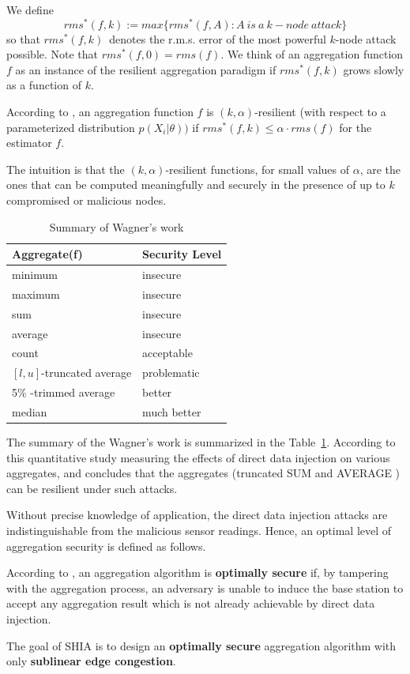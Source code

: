 	We define
	\begin{equation}
		rms^*(f,k) := max\{rms^*(f,A): A\ is\ a\ k-node\ attack\}
	\end{equation}
	so that $rms^*(f,k)$\ denotes the r.m.s. error of the most powerful
	$k$-node attack possible. 
	Note that $rms^* (f, 0) = rms(f)$.
	We think of an aggregation function $f$ as an instance of the resilient aggregation paradigm if $rms^* (f, k)$ grows slowly as a function of $k$.
	\begin{definition}
		According to \cite{wagner2004resilient}, an aggregation function $f$ is $(k, \alpha)$-resilient (with respect to a parameterized distribution $p(X_{i} | \theta))$ if $rms^*(f, k) \le \alpha \cdot rms(f)$ for the estimator $f$.
	\end{definition}
	The intuition is that the $(k, \alpha)$-resilient functions, for small values of $\alpha$, are the ones that can be computed meaningfully and securely in the presence of up to $k$ compromised or malicious nodes.
	\begin{table}[!htb]	
		\begin{center}
			\begin{tabular}{ |l| l| }
				\hline
			    Aggregate(f) & Security Level \\
			    \hline
			    minimum & insecure \\
			    maximum & insecure \\
			    sum & insecure \\
				average & insecure \\
				count & acceptable \\
				$[l,u]$-truncated average & problematic \\
				5\% -trimmed average & better \\
				median & much better \\
			    \hline
			\end{tabular}
		\end{center}
		 \caption{Summary of Wagner's work}
		 \label{table:wagner}
	\end{table}
	The summary of the Wagner's work is summarized in the Table~\ref{table:wagner}.
	According to this quantitative study measuring the effects of direct data injection on various aggregates, and concludes that the aggregates (truncated SUM and AVERAGE ) can be resilient under such attacks.

	Without precise knowledge of application, the direct data injection attacks are indistinguishable from the malicious sensor readings. Hence, an optimal level of aggregation security is defined as follows.  
	\begin{definition}
		\label{def:optimally-secure}
		According to \cite{chan2006secure}, an aggregation algorithm is \textbf{optimally secure} if, by tampering with the aggregation process, an adversary is unable to induce the base station to accept any aggregation result which is not already achievable by direct data injection.
	\end{definition}
	The goal of SHIA is to design an \textbf{optimally secure} aggregation algorithm with only \textbf{sublinear edge congestion}.

